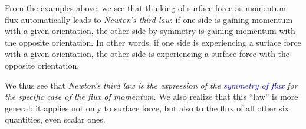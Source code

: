 \documentclass[a4paper,12pt,%
onecolumn,oneside,%
british%
]{memoir}
\newcommand{\langnohyph}[1]{\begin{hyphenrules}{nohyphenation}#1\end{hyphenrules}}
\newcommand*{\amp}{\&}
\renewcommand*{\|}[1][]{\nonscript\:#1\vert\nonscript\:\mathopen{}}
\newcommand*{\sect}{\S}%
\renewcommand*{\autoref}[3][\sect\,\ref]{\textcolor{blue}{#3}
\raisebox{0.6ex}{\color{blue}\miniscule%
\faIcon{angle-right}%
\;#1{#2}\;p.\,\pageref{#2}}}
\begin{document}
%
%
From the examples above, we see that thinking of surface force as momentum flux automatically leads to \emph{Newton's third law}: if one side is gaining momentum with a given orientation, the other side by symmetry is gaining momentum with the opposite orientation. In other words, if one side is experiencing a surface force with a given orientation, the other side is experiencing a surface force with the opposite orientation.

We thus see that \emph{Newton's third law is the expression of the \autoref{def:symmetryflux}{symmetry of flux} for the specific case of the flux of momentum}. We also realize that this \enquote{law} is more general: it applies not only to surface force, but also to the flux of all other six quantities, even scalar ones.

% 
\end{document}
